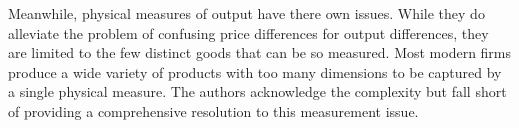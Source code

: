\documentclass[10pt]{article}
\begin{document}
\begin{spacing}{1.5}
	Meanwhile, physical measures of output  have there own issues. While they do alleviate the problem of confusing price differences for output differences, they are limited to the few distinct goods that can be so measured. Most modern firms produce a wide variety of products with too many dimensions to be captured by a single physical measure. The authors acknowledge the complexity but fall short of providing a comprehensive resolution to this measurement issue. 
	
	

	
	\end{spacing}
\end{document}
